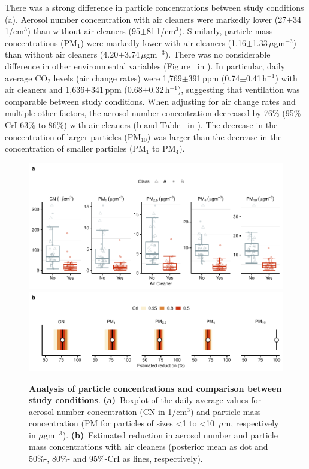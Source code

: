 \documentclass[fleqn,11pt]{wlscirep}
\begin{document}
There was a strong difference in particle concentrations between study conditions (a). Aerosol number concentration with air cleaners were markedly lower (27$\pm$34\,1/cm$^3$) than without air cleaners (95$\pm$81\,1/cm$^3$). Similarly, particle mass concentrations (\eg PM$_1$) were markedly lower with air cleaners (1.16$\pm$1.33\,$\mu$gm$^{-3}$) than without air cleaners (4.20$\pm$3.74\,$\mu$gm$^{-3}$). There was no considerable difference in other environmental variables (Figure~ in \supp). In particular, daily average CO$_2$ levels (air change rates) were 1,769$\pm$391\,ppm (0.74$\pm$0.41\,h$^{-1}$) with air cleaners and 1,636$\pm$341\,ppm (0.68$\pm$0.32\,h$^{-1}$), suggesting that ventilation was comparable between study conditions. When adjusting for air change rates and multiple other factors, the aerosol number concentration decreased by 76\% (95\%-CrI 63\% to 86\%) with air cleaners (b and Table~ in \supp). The decrease in the concentration of larger particles (PM$_{10}$) was larger than the decrease in the concentration of smaller particles (PM$_1$ to PM$_{4}$). 

\begin{figure}[!htpb]
\centering
    \includegraphics[width=\linewidth]{../../results/env-data/particles-boxplot.pdf}
    \includegraphics[width=\linewidth]{../../results/env-data/estimation-results-figure.pdf}
    \caption{\textbf{Analysis of particle concentrations and comparison between study conditions}. \textbf{(a)}~Boxplot of the daily average values for aerosol number concentration (CN in 1/cm$^3$) and particle mass concentration (PM for particles of sizes <1 to <10~$\mu$m, respectively in $\mu$gm$^{-3}$). \textbf{(b)}~Estimated reduction in aerosol number and particle mass concentrations with air cleaners (posterior mean as dot and 50\%-, 80\%- and 95\%-CrI as lines, respectively). }
    \label{fig:palas-results}
\end{figure}
\end{document}
